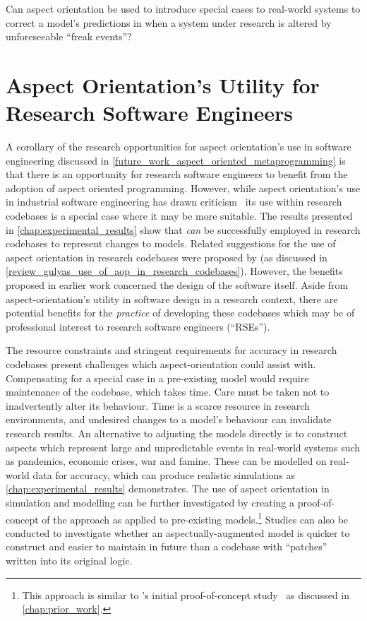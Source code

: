 \begin{researchquestion}
Can aspect orientation be used to introduce special cases to real-world systems
to correct a model's predictions in when a system under research is altered by
unforeseeable ``freak events''?
\end{researchquestion}




\section{Aspect Orientation's Utility for Research Software Engineers}
\label{future_work_aop_for_rses}

A corollary of the research opportunities for aspect orientation's use in
software engineering discussed in
\cref{future_work_aspect_oriented_metaprogramming} is that there is an
opportunity for research software engineers to benefit from the adoption of
aspect oriented programming. However, while aspect orientation's use in
industrial software engineering has drawn
criticism~\cite{steimann06paradoxical,przybylek2010wrong,Constantinides04aopconsidered}
its use within research codebases is a special case where it may be more
suitable. The results presented in \cref{chap:experimental_results} show that
\aop{} \emph{can} be successfully employed in research codebases to represent
changes to models. Related suggestions for the use of aspect orientation in
research codebases were proposed by \citeauthor{gulyas1999use} (as discussed in
\cref{review_gulyas_use_of_aop_in_research_codebases}). However, the benefits
proposed in earlier work concerned the design of the software itself. Aside from
aspect-orientation's utility in software design in a research context, there are
potential benefits for the \emph{practice} of developing these codebases which
may be of professional interest to research software engineers (``RSEs'').


The resource constraints and stringent requirements for accuracy in research
codebases present challenges which aspect-orientation could assist with.
Compensating for a special case in a pre-existing model would require
maintenance of the codebase, which takes time. Care must be taken not to
inadvertently alter its behaviour. Time is a scarce resource in research
environments, and undesired changes to a model's behaviour can invalidate
research results. An alternative to adjusting the models directly is to
construct aspects which represent large and unpredictable events in real-world
systems such as pandemics, economic crises, war and famine. These can be
modelled on real-world data for accuracy, which can produce realistic
simulations as \cref{chap:experimental_results} demonstrates. The use of aspect
orientation in simulation and modelling can be further investigated by creating
a proof-of-concept of the approach as applied to pre-existing
models.\footnote{This approach is similar to \pdsf{}'s initial proof-of-concept
study~\cite{wallis2018caise} as discussed in \cref{chap:prior_work}.} Studies
can also be conducted to investigate whether an aspectually-augmented model is
quicker to construct and easier to maintain in future than a codebase with
``patches'' written into its original logic.

